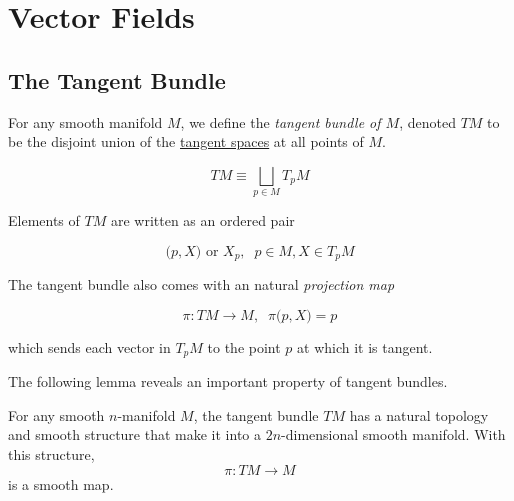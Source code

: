 \documentclass{article}
\newcounter{definition}[section]
\begin{document}
\section{Vector Fields}

  \subsection{The Tangent Bundle}

    \begin{definition}
      \label{def:tangent-bundle-of-m}
      For any smooth manifold $M$, we define the \textit{tangent bundle of $M$}, denoted $TM$ to be the disjoint union of the \hyperref[mv-def:tangent-space]{tangent spaces} at all points of $M$. 

        \begin{equation}
          TM \equiv \bigsqcup_{p \in M} T_p M
        \end{equation}

      Elements of $TM$ are written as an ordered pair 

        \begin{equation}
          \big(p, X \big) \text{ or } X_p, \;\; p \in M, X \in T_p M
        \end{equation}

      The tangent bundle also comes with an natural \textit{projection map}

        \begin{equation}
          \pi: TM \to M, \;\; \pi \big(p, X\big) = p
        \end{equation}

      which sends each vector in $T_p M$ to the point $p$ at which it is tangent. 
    \end{definition}

    The following lemma reveals an important property of tangent bundles. 

    \begin{lemma}
      \label{thm:smooth-structure-on-the-tangent-bundle}
      For any smooth $n$-manifold $M$, the tangent bundle $TM$ has a natural topology and smooth structure that make it into a $2n$-dimensional smooth manifold. With this structure, 
        \begin{equation}
          \pi: TM \to M
        \end{equation}
      is a smooth map. 
    \end{lemma}
\end{document}
